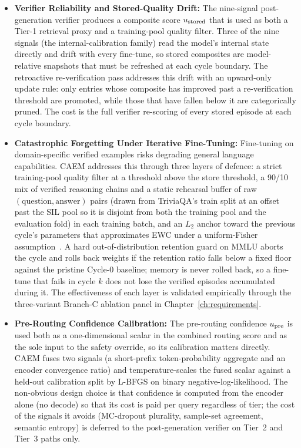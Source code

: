 \begin{itemize}
    \item \textbf{Verifier Reliability and Stored-Quality Drift:} The nine-signal post-generation verifier produces a composite score $u_{\text{stored}}$ that is used as both a Tier-1 retrieval proxy and a training-pool quality filter. Three of the nine signals (the internal-calibration family) read the model's internal state directly and drift with every fine-tune, so stored composites are model-relative snapshots that must be refreshed at each cycle boundary. The retroactive re-verification pass addresses this drift with an upward-only update rule: only entries whose composite has improved past a re-verification threshold are promoted, while those that have fallen below it are categorically pruned. The cost is the full verifier re-scoring of every stored episode at each cycle boundary.

    \item \textbf{Catastrophic Forgetting Under Iterative Fine-Tuning:} Fine-tuning on domain-specific verified examples risks degrading general language capabilities. CAEM addresses this through three layers of defence: a strict training-pool quality filter at a threshold above the store threshold, a 90/10 mix of verified reasoning chains and a static rehearsal buffer of raw $(\text{question}, \text{answer})$ pairs (drawn from TriviaQA's train split at an offset past the SIL pool so it is disjoint from both the training pool and the evaluation fold) in each training batch, and an $L_{2}$ anchor toward the previous cycle's parameters that approximates EWC under a uniform-Fisher assumption~\cite{doi:10.1073/pnas.1611835114}. A hard out-of-distribution retention guard on MMLU aborts the cycle and rolls back weights if the retention ratio falls below a fixed floor against the pristine Cycle-0 baseline; memory is never rolled back, so a fine-tune that fails in cycle $k$ does not lose the verified episodes accumulated during it. The effectiveness of each layer is validated empirically through the three-variant Branch-C ablation panel in Chapter~\ref{ch:requirements}.

    \item \textbf{Pre-Routing Confidence Calibration:} The pre-routing confidence $u_{\text{pre}}$ is used both as a one-dimensional scalar in the combined routing score and as the sole input to the safety override, so its calibration matters directly. CAEM fuses two signals (a short-prefix token-probability aggregate and an encoder convergence ratio) and temperature-scales the fused scalar against a held-out calibration split by L-BFGS on binary negative-log-likelihood. The non-obvious design choice is that confidence is computed from the encoder alone (no decode) so that its cost is paid per query regardless of tier; the cost of the signals it avoids (MC-dropout plurality, sample-set agreement, semantic entropy) is deferred to the post-generation verifier on Tier~2 and Tier~3 paths only.


\end{itemize}
